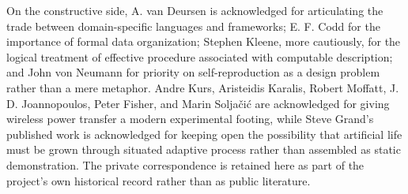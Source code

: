 \documentclass[a4paper,english]{article}
\begin{document}
On the constructive side, A. van Deursen is acknowledged for articulating
the trade between domain-specific languages and frameworks; E. F. Codd
for the importance of formal data organization; Stephen Kleene, more
cautiously, for the logical treatment of effective procedure associated
with computable description; and John von Neumann for priority on
self-reproduction as a design problem rather than a mere metaphor.
Andre Kurs, Aristeidis Karalis, Robert Moffatt, J. D. Joannopoulos,
Peter Fisher, and Marin Solja\v{c}i\'{c} are acknowledged for giving
wireless power transfer a modern experimental footing, while Steve
Grand's published work is acknowledged for keeping open the possibility
that artificial life must be grown through situated adaptive process
rather than assembled as static demonstration. The private correspondence
is retained here as part of the project's own historical record rather
than as public literature.
\end{document}
